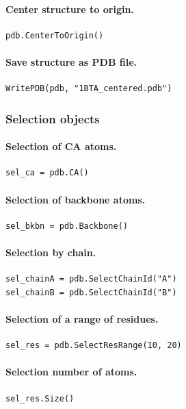 \documentclass[12pt,a4paper]{article}
\begin{document}
\paragraph{Center structure to origin.}
\begin{verbatim}
pdb.CenterToOrigin()
\end{verbatim}


\paragraph{Save structure as PDB file.}
\begin{verbatim}
WritePDB(pdb, "1BTA_centered.pdb")
\end{verbatim}


\subsubsection{Selection objects}

\paragraph{Selection of CA atoms.}
\begin{verbatim}
sel_ca = pdb.CA()
\end{verbatim}


\paragraph{Selection of backbone atoms.}
\begin{verbatim}
sel_bkbn = pdb.Backbone()
\end{verbatim}


\paragraph{Selection by chain.}
\begin{verbatim}
sel_chainA = pdb.SelectChainId("A")
sel_chainB = pdb.SelectChainId("B")
\end{verbatim}


\paragraph{Selection of a range of residues.}
\begin{verbatim}
sel_res = pdb.SelectResRange(10, 20)
\end{verbatim}


\paragraph{Selection number of atoms.}
\begin{verbatim}
sel_res.Size()
\end{verbatim}
\end{document}
